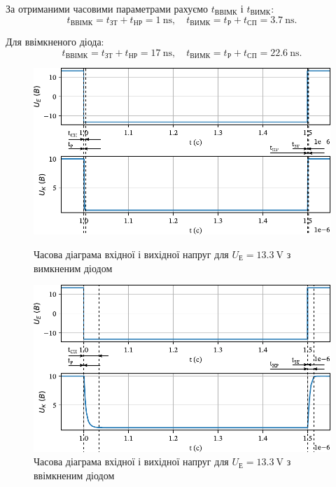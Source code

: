 \documentclass[a4paper,oneside,DIV=10,12pt]{scrartcl}
\begin{document}
		За отриманими часовими параметрами рахуємо $t_{\text{ВВІМК}}$ і $t_{\text{ВИМК}}$:
		\[
			t_{\text{ВВІМК}} = t_{\text{ЗТ}} + t_{\text{НР}} = \SI{1}{\nano\second}, \quad t_{\text{ВИМК}} = t_{\text{Р}} + t_{\text{СП}} = \SI{3,7}{\nano\second}.
		\]
		
		Для ввімкненого діода:
		\[
			t_{\text{ВВІМК}} = t_{\text{ЗТ}} + t_{\text{НР}} = \SI{17}{\nano\second}, \quad t_{\text{ВИМК}} = t_{\text{Р}} + t_{\text{СП}} = \SI{22,6}{\nano\second}.
		\]
		
		\begin{figure}[p]
			\centering
			\includegraphics[width=\textwidth]{01-13p3-01-nodiode-edited.pdf}
			\caption{Часова діаграма вхідної і вихідної напруг для $U_{\text{Е}} = \SI{13,3}{\volt}$ з вимкненим діодом}
			
			\vspace*{\floatsep}
		
			\centering
			\includegraphics[width=\textwidth]{01-13p3-02-diode-edited.pdf}
			\caption{Часова діаграма вхідної і вихідної напруг для $U_{\text{Е}} = \SI{13,3}{\volt}$ з ввімкненим діодом}
		\end{figure}
		
\end{document}
